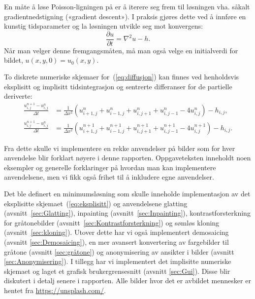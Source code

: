 En måte å løse Poisson-ligningen på er å iterere seg frem til løsningen vha. såkalt gradientnedstigning («gradient descent»). I praksis gjøres dette ved å innføre en kunstig tidsparameter og la løsningen utvikle seg mot konvergens:
\begin{equation}
\frac{\partial u}{\partial t} = \nabla^2 u - h.
\label{eq:diffusjon}
\end{equation}
Når man velger denne fremgangsmåten, må man også velge en initialverdi for bildet, $u(x, y, 0) = u_0(x, y)$.

To diskrete numeriske skjemaer for~(\ref{eq:diffusjon}) kan finnes ved henholdsvis eksplisitt og implisitt tidsintegrasjon og sentrerte differanser for de partielle deriverte:
\begin{align}
  \frac{u^{n+1}_{i,j} - u^n_{i,j}}{\Delta t} &= \frac{1}{\Delta x^2}
                                               (u^n_{i+1,j} +
                                               u^n_{i-1,j} +
                                               u^n_{i,j+1} +
                                               u^n_{i,j-1} -4 
                                               u^n_{i,j}) - h_{i,j},
                                               \label{eq:eksplisitt}  \\
  \frac{u^{n+1}_{i,j} - u^n_{i,j}}{\Delta t} &= \frac{1}{\Delta x^2}
                                               (u^{n+1}_{i+1,j} +
                                               u^{n+1}_{i-1,j} +
                                               u^{n+1}_{i,j+1} +
                                               u^{n+1}_{i,j-1} -4 
                                               u^{n+1}_{i,j}) - h_{i,j}.
                                               \label{eq:implisitt}
\end{align}

Fra dette skulle vi implementere en rekke anvendelser på bilder som for hver anvendelse blir forklart nøyere i denne rapporten. Oppgaveteksten inneholdt noen eksempler og generelle forklaringer på hvordan man kan implementere anvendelsene, men vi fikk også frihet til å inkludere egne anvendelser.

Det ble definert en minimumsløsning som skulle inneholde implementasjon av det eksplisitte skjemaet~(\ref{eq:eksplisitt}) og anvendelsene glatting (avsnitt~\ref{sec:Glatting}), inpainting (avsnitt~\ref{sec:Inpainting}), kontrastforsterkning for gråtonebilder (avsnitt~\ref{sec:Kontrastforsterkning}) og sømløs kloning (avsnitt~\ref{sec:kloning}). Utover dette har vi også implementert demosaicing (avsnitt \ref{sec:Demosaicing}), en mer avansert konvertering av fargebilder til gråtone (avsnitt \ref{sec:gråtone}) og anonymisering av ansikter i bilder (avsnitt \ref{sec:Anonymisering}). I tillegg har vi implementert det implisitte numeriske skjemaet og laget et grafisk brukergrensesnitt (avsnitt \ref{sec:Gui}). Disse blir diskutert i detalj senere i rapporten. Alle bilder hvor det er avbildet mennesker er hentet fra \url{https://unsplash.com/}.

